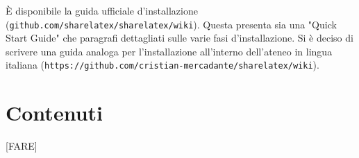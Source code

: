 È disponibile la guida ufficiale d'installazione (\verb|github.com/sharelatex/sharelatex/wiki|). Questa presenta sia una "Quick Start Guide" che paragrafi dettagliati sulle varie fasi d'installazione. Si è deciso di scrivere una guida analoga per l'installazione all'interno dell'ateneo in lingua italiana (\verb|https://github.com/cristian-mercadante/sharelatex/wiki|).

\section{Contenuti}
\huge [FARE]
\normalsize

